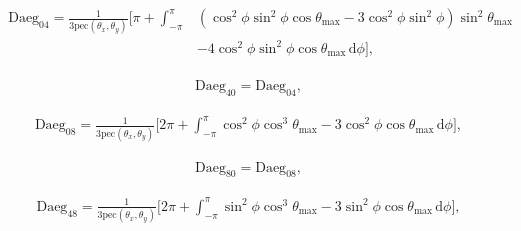 \documentclass[a4paper,11pt,twoside,openright]{book}
\providecommand{\pec}{{\mathrm{pec}}}%
\def\lthtmlcheckvsize{\ifdim\ht\sizebox<\vsize 
  \ifdim\wd\sizebox<\hsize\expandafter\hfill\fi \expandafter\vfill
  \else\expandafter\vss\fi}%
\begin{document}
{\newpage\clearpage
\setcounter{equation}{58}
%
\begin{subequations}\begin{flalign}
\begin{split}
\textrm{Daeg}_{04} = \frac{1}{3\pec (\theta_x , \theta_y )} \Bigg[
\pi +
\int_{-\pi}^{\pi}
& \left( \cos^2\phi \sin^2\phi \cos\theta_{\textrm{max}}- 3\cos^2\phi \sin^2\phi \right) \sin^2\theta_{\textrm{max}}\\
& - 4\cos^2\phi \sin^2\phi \cos\theta_{\textrm{max}}
\,\mathrm{d}\phi
\Bigg] ,
\end{split} &
\end{flalign}\end{subequations}%
\lthtmldisplayZ
\lthtmlcheckvsize\clearpage}

{\newpage\clearpage
\setcounter{equation}{58}
%
\begin{subequations}\begin{flalign}
&\textrm{Daeg}_{40} = \textrm{Daeg}_{04} , &
\end{flalign}\end{subequations}%
\lthtmldisplayZ
\lthtmlcheckvsize\clearpage}

{\newpage\clearpage
\setcounter{equation}{58}
%
\begin{subequations}\begin{flalign}
&\textrm{Daeg}_{08} = \frac{1}{3\pec (\theta_x , \theta_y )} \Bigg[
2\pi +
\int_{-\pi}^{\pi}
\cos^2\phi \cos^3\theta_{\textrm{max}}- 3\cos^2\phi \cos\theta_{\textrm{max}}
\,\mathrm{d}\phi
\Bigg] , &
\end{flalign}\end{subequations}%
\lthtmldisplayZ
\lthtmlcheckvsize\clearpage}

{\newpage\clearpage
\setcounter{equation}{58}
%
\begin{subequations}\begin{flalign}
&\textrm{Daeg}_{80} = \textrm{Daeg}_{08} , &
\end{flalign}\end{subequations}%
\lthtmldisplayZ
\lthtmlcheckvsize\clearpage}

{\newpage\clearpage
\setcounter{equation}{58}
%
\begin{subequations}\begin{flalign}
&\textrm{Daeg}_{48} = \frac{1}{3\pec (\theta_x , \theta_y )} \Bigg[
2\pi +
\int_{-\pi}^{\pi}
\sin^2\phi \cos^3\theta_{\textrm{max}}- 3\sin^2\phi \cos\theta_{\textrm{max}}
\,\mathrm{d}\phi
\Bigg] , &
\end{flalign}\end{subequations}%
\lthtmldisplayZ
\lthtmlcheckvsize\clearpage}
\end{document}
